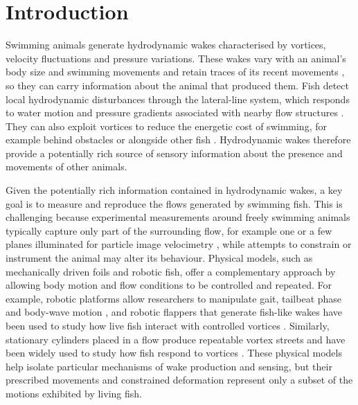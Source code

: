 \documentclass[openacc]{rsproca_new}
\begin{document}
\begin{fmtext}
\end{fmtext}

\maketitle
\section{Introduction}
Swimming animals generate hydrodynamic wakes characterised by vortices, velocity fluctuations and pressure variations. These wakes vary with an animal's body size and swimming movements \cite{drucker2000,videler2002,hanke2004} and retain traces of its recent movements \cite{weihs1975}, so they can carry information about the animal that produced them. Fish detect local hydrodynamic disturbances through the lateral-line system, which responds to water motion and pressure gradients associated with nearby flow structures \cite{coombs1988,franosch2009,chagnaud2007}. They can also exploit vortices to reduce the energetic cost of swimming, for example behind obstacles or alongside other fish \cite{liao2003,li2021}. Hydrodynamic wakes therefore provide a potentially rich source of sensory information about the presence and movements of other animals.

Given the potentially rich information contained in hydrodynamic wakes, a key goal is to measure and reproduce the flows generated by swimming fish. This is challenging because experimental measurements around freely swimming animals typically capture only part of the surrounding flow, for example one or a few planes illuminated for particle image velocimetry \cite{tytell2004,hanke2004}, while attempts to constrain or instrument the animal may alter its behaviour. Physical models, such as mechanically driven foils and robotic fish, offer a complementary approach by allowing body motion and flow conditions to be controlled and repeated. For example, robotic platforms allow researchers to manipulate gait, tailbeat phase and body-wave motion \cite{li2021}, and robotic flappers that generate fish-like wakes have been used to study how live fish interact with controlled vortices \cite{thandiackal2023}. Similarly, stationary cylinders placed in a flow produce repeatable vortex streets and have been widely used to study how fish respond to vortices \cite{liao2003jeb,liao2007}. These physical models help isolate particular mechanisms of wake production and sensing, but their prescribed movements and constrained deformation represent only a subset of the motions exhibited by living fish.
\end{document}
